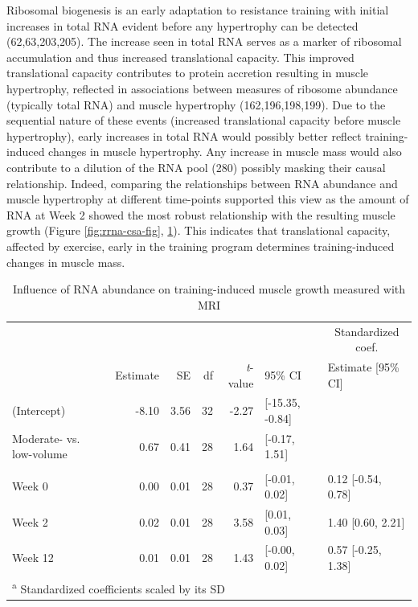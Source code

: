 \documentclass[twoside,10pt]{gihclass} %
\begin{document}
Ribosomal biogenesis is an early adaptation to resistance training with initial increases in total RNA evident before any hypertrophy can be detected
(62,63,203,205).
The increase seen in total RNA serves as a marker of ribosomal accumulation and thus increased translational capacity. This improved translational capacity contributes to protein accretion resulting in muscle hypertrophy, reflected in associations between measures of ribosome abundance (typically total RNA) and muscle hypertrophy
(162,196,198,199).
Due to the sequential nature of these events (increased translational capacity before muscle hypertrophy), early increases in total RNA would possibly better reflect training-induced changes in muscle hypertrophy.
Any increase in muscle mass would also contribute to a dilution of the RNA pool
(280)
possibly masking their causal relationship.
Indeed, comparing the relationships between RNA abundance and muscle hypertrophy at different time-points supported this view as the amount of RNA at Week 2 showed the most robust relationship with the resulting muscle growth (Figure \ref{fig:rrna-csa-fig}, \ref{tab:rna-csa-tab}). This indicates that translational capacity, affected by exercise, early in the training program determines training-induced changes in muscle mass.
\begin{table}

\caption{\label{tab:rna-csa-tab}Influence of RNA abundance on training-induced muscle growth measured with MRI}
\centering
\fontsize{7}{9}\selectfont
\begin{tabular}[t]{lrrrrll}
\toprule
\multicolumn{6}{c}{ } & \multicolumn{1}{c}{Standardized coef.} \\
\cmidrule(l{3pt}r{3pt}){7-7}
 & Estimate & SE & df & \textit{t}-value & 95\% CI & Estimate [95\% CI]\\
\midrule
(Intercept) & -8.10 & 3.56 & 32 & -2.27 & [-15.35, -0.84] & \\
Moderate- vs. low-volume & 0.67 & 0.41 & 28 & 1.64 & [-0.17, 1.51] & \\
\addlinespace[0.3em]
\multicolumn{7}{l}{\textbf{RNA abundance (ng mg\textsuperscript{-1})}}\\
\hspace{1em}Week 0 & 0.00 & 0.01 & 28 & 0.37 & [-0.01, 0.02] & 0.12 [-0.54, 0.78]\\
\hspace{1em}Week 2 & 0.02 & 0.01 & 28 & 3.58 & [0.01, 0.03] & 1.40 [0.60, 2.21]\\
\hspace{1em}Week 12 & 0.01 & 0.01 & 28 & 1.43 & [-0.00, 0.02] & 0.57 [-0.25, 1.38]\\
\bottomrule
\multicolumn{7}{l}{\textsuperscript{a} Standardized coefficients scaled by its SD}\\
\end{tabular}
\end{table}
\end{document}

